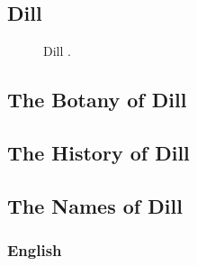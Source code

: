 \subsection{Dill}
\label{sec:dill}



\begin{figure}[!ht]
	\vspace{-4ex}
	\centering
	\hfill
	\caption{Dill \textit{}.}
	\label{fig:dill_imgs}
\end{figure}

\subsection{The Botany of Dill}

\subsection{The History of Dill}

\subsection{The Names of Dill}

\subsubsection{English}

